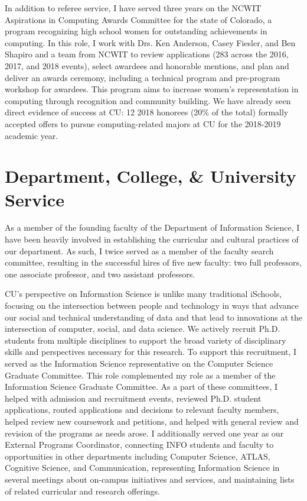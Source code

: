 \documentclass[11pt]{article}
\begin{document}
In addition to referee service, I have served three years on the NCWIT Aspirations in Computing Awards Committee for the state of Colorado, a program recognizing high school women for outstanding achievements in computing. In this role, I work with Drs. Ken Anderson, Casey Fiesler, and Ben Shapiro and a team from NCWIT to review applications (283 across the 2016, 2017, and 2018 events), select awardees and honorable mentions, and plan and deliver an awards ceremony, including a technical program and pre-program workshop for awardees. This program aims to increase women's representation in computing through recognition and community building. We have already seen direct evidence of success at CU: 12 2018 honorees (20\% of the total) formally accepted offers to pursue computing-related majors at CU for the 2018-2019 academic year.

\section*{Department, College, \& University Service}
As a member of the founding faculty of the Department of Information Science, I have been heavily involved in establishing the curricular and cultural practices of our department. As such, I twice served as a member of the faculty search committee, resulting in the successful hires of five new faculty: two full professors, one associate professor, and two assistant professors. 

CU's perspective on Information Science is unlike many traditional iSchools, focusing on the intersection between people and technology in ways that advance our social and technical understanding of data and that lead to innovations at the intersection of computer, social, and data science. We actively recruit Ph.D. students from multiple disciplines to support the broad variety of disciplinary skills and perspectives necessary for this research. To support this recruitment, I served as the Information Science representative on the Computer Science Graduate Committee.
This role complemented my role as a member of the Information Science Graduate Committee. As a part of these committees, I helped with admission and recruitment events, reviewed Ph.D. student applications, routed applications and decisions to relevant faculty members, helped review new coursework and petitions, and helped with general review and revision of the programs as needs arose. I additionally served one year as our External Programs Coordinator, connecting INFO students and faculty to opportunities in other departments including Computer Science, ATLAS, Cognitive Science, and Communication, representing Information Science in several meetings about on-campus initiatives and services, and maintaining lists of related curricular and research offerings.
\end{document}
